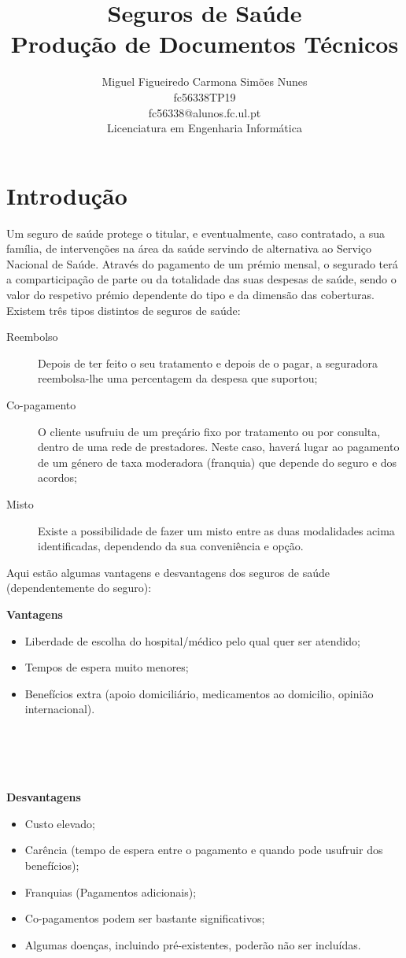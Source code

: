 \documentclass[11pt,a4paper,titlepage]{article}
\title{Seguros de Saúde\\Produção de Documentos Técnicos}
\author{Miguel Figueiredo Carmona Simões Nunes\\fc56338\quad TP19\\fc56338@alunos.fc.ul.pt\\Licenciatura em Engenharia Informática}
\date{}
\begin{document}
\maketitle
\tableofcontents
{}
\setcounter{page}{1}
\newpage
{}
\section{Introdução}
Um seguro de saúde protege o titular, e eventualmente, caso contratado, a sua família, de intervenções na área da saúde servindo de alternativa ao Serviço Nacional de Saúde. Através do pagamento de um prémio mensal, o segurado terá a comparticipação de parte ou da totalidade das suas despesas de saúde, sendo o valor do respetivo prémio dependente do tipo e da dimensão das coberturas. Existem três tipos distintos de seguros de saúde:
\begin{description}
\item[Reembolso] Depois de ter feito o seu tratamento e depois de o pagar, a seguradora reembolsa-lhe uma percentagem da despesa que suportou;
\item[Co-pagamento] O cliente usufruiu de um preçário fixo por tratamento ou por consulta, dentro de uma rede de prestadores. Neste caso, haverá lugar ao pagamento de um género de taxa moderadora (franquia) que depende do seguro e dos acordos;
\item[Misto] Existe a possibilidade de fazer um misto entre as duas modalidades acima identificadas, dependendo da sua conveniência e opção.
\end{description}
Aqui estão algumas vantagens e desvantagens dos seguros de saúde (dependentemente do seguro):
\begin{center}
\begin{multicols}{2}
\textbf{Vantagens}\\
\begin{itemize}
\item Liberdade de escolha do hospital/médico pelo qual quer ser atendido;
\item Tempos de espera muito menores;
\item Benefícios extra (apoio domiciliário, medicamentos ao domicilio, opinião internacional).
\end{itemize}
\quad \\ \quad \\ \quad \\ \quad \\
\textbf{Desvantagens}\\
\begin{itemize}
\item Custo elevado;
\item Carência (tempo de espera entre o pagamento e quando pode usufruir dos benefícios);
\item Franquias (Pagamentos adicionais);
\item Co-pagamentos podem ser bastante significativos;
\item Algumas doenças, incluindo pré-existentes, poderão não ser incluídas.
\end{itemize}
\end{multicols}
\end{center}
\newpage
\end{document}
